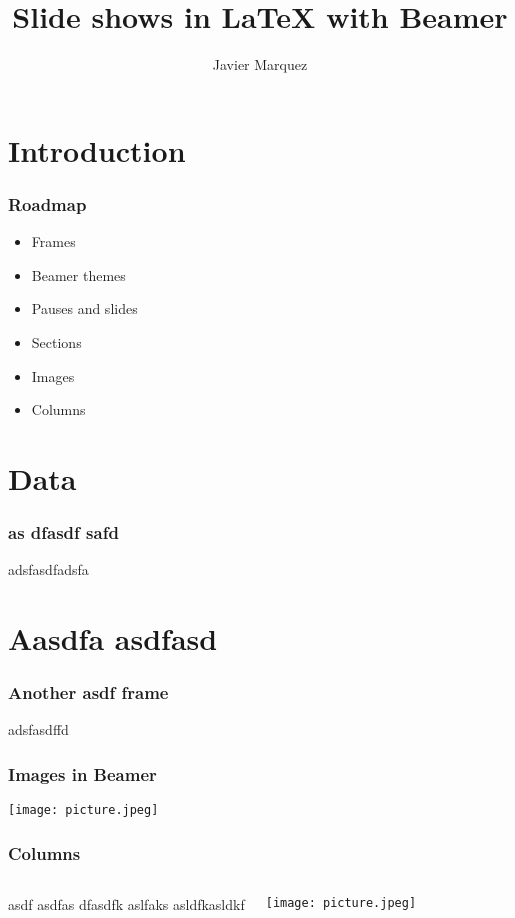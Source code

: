 \documentclass{beamer}
\title{Slide shows in {\LaTeX} with Beamer}
\author{Javier Marquez}
\begin{document}
\maketitle

\section{Introduction}

\begin{frame}
	\frametitle{Roadmap}
	\begin{itemize}
		\item Frames \pause
		\item Beamer themes \pause
		\item Pauses and slides \pause
		\item Sections \pause
		\item Images \pause
		\item Columns
	\end{itemize}
\end{frame}

\section{Data}

\begin{frame}
	\frametitle{as dfasdf safd}

	adsfasdfadsfa
\end{frame}

\section{Aasdfa asdfasd}

\begin{frame}
	\frametitle{Another asdf frame}

	adsfasdffd
\end{frame}

\begin{frame}
	\frametitle{Images in Beamer}

	\texttt{[image: picture.jpeg]}
\end{frame}

\begin{frame}
	\frametitle{Columns}

	\begin{columns}

		asdf asdfas dfasdfk aslfaks asldfkasldkf


		\texttt{[image: picture.jpeg]}
	\end{columns}
\end{frame}
\end{document}
